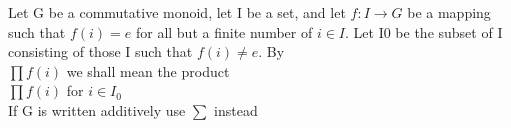 \documentclass{article}
\begin{document}
    Let G be a commutative monoid, let I be a set, and
    let \(f: I \to G\) be a mapping such that \(f(i) = e\) for
    all but a finite number of \(i \in I\).
    Let I0 be the subset of I consisting of those I
    such that \(f(i) \ne e\). By\\
        \(\prod f(i)\) we shall mean the product \\
        \(\prod f(i)\) for \(i \in I_{0}\)\\
    If G is written additively use \(\sum\) instead\\
\end{document}
